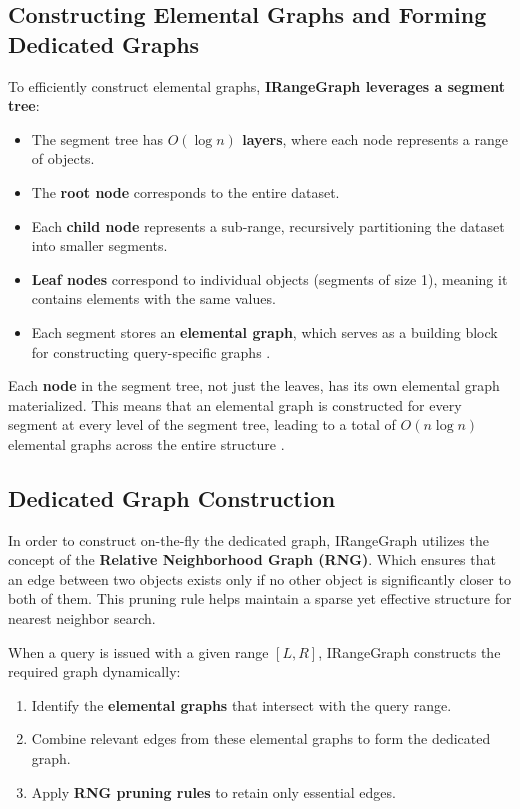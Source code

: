 \subsection{Constructing Elemental Graphs and Forming Dedicated Graphs}
To efficiently construct elemental graphs, \textbf{IRangeGraph leverages a segment tree}:
\begin{itemize}
    \item The segment tree has \textbf{$O(\log n)$ layers}, where each node represents a range of objects.
    \item The \textbf{root node} corresponds to the entire dataset.
    \item Each \textbf{child node} represents a sub-range, recursively partitioning the dataset into smaller segments.
    \item \textbf{Leaf nodes} correspond to individual objects (segments of size 1), meaning it contains elements with the same values.
    \item Each segment stores an \textbf{elemental graph}, which serves as a building block for constructing query-specific graphs \cite{irangegraph}.
\end{itemize}


Each \textbf{node} in the segment tree, not just the leaves, has its own elemental graph materialized. This means that an elemental graph is constructed for every segment at every level of the segment tree, leading to a total of $O(n \log n)$ elemental graphs across the entire structure \cite{irangegraph}.



\subsection{Dedicated Graph Construction}
In order to construct on-the-fly the dedicated graph, IRangeGraph utilizes the concept of the \textbf{Relative Neighborhood Graph (RNG)}. Which ensures that an edge between two objects exists only if no other object is significantly closer to both of them. This pruning rule helps maintain a sparse yet effective structure for nearest neighbor search. 

When a query is issued with a given range $[L, R]$, IRangeGraph constructs the required graph dynamically:
\begin{enumerate}
    \item Identify the \textbf{elemental graphs} that intersect with the query range.
    \item Combine relevant edges from these elemental graphs to form the dedicated graph.
    \item Apply \textbf{RNG pruning rules} to retain only essential edges.
\end{enumerate}


